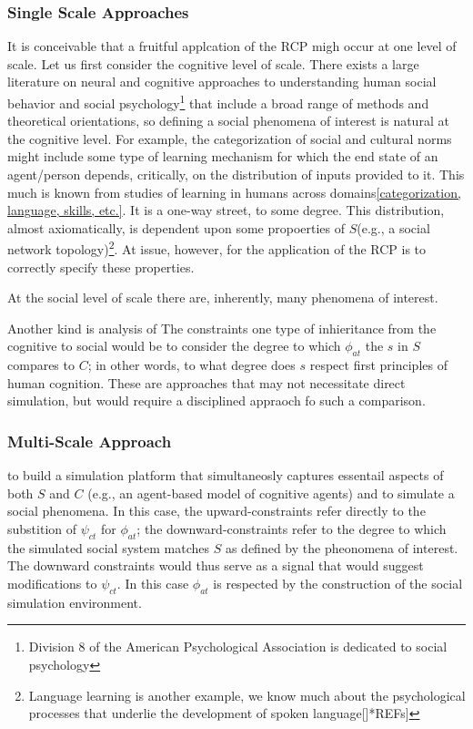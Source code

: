 \documentclass{article}
\begin{document}
\subsubsection{Single Scale Approaches}
It is conceivable that a fruitful applcation of the RCP migh occur at one level of scale.   
Let us first consider the cognitive level of scale.  There exists a large literature on neural and cognitive approaches to understanding human social behavior and social psychology\footnote{Division 8 of the American Psychological Association is dedicated to social psychology } that include a broad range of methods and theoretical orientations, so defining a social phenomena of interest is natural at the cognitive level.  For example, the categorization of social and cultural norms might include some type of learning mechanism for which the end state of an agent/person depends, critically, on the distribution of inputs provided to it.  This much is known from studies of learning in humans across domains\ref{categorization, language, skills, etc.}.  It is a one-way street, to some degree.  This distribution, almost axiomatically, is dependent upon some propoerties of $S$(e.g., a social network topology)\footnote{Language learning is another example, we know much about the psychological processes that underlie the development of spoken language[]*REFs]}.  At issue, however, for the application of the RCP is to correctly specify these properties. 

At the social level of scale there are, inherently, many phenomena of interest.    

Another kind is analysis of The constraints one type of inhieritance from the cognitive to social would be to consider the degree to which $\phi_{at}$ the $s$ in $S$ compares to $C$; in other words, to what degree does $s$ respect first principles of human cognition.  These are approaches that may not necessitate direct simulation, but would require a disciplined appraoch fo such a comparison.

\subsubsection{Multi-Scale Approach}
 
to build a simulation platform that simultaneosly captures essentail aspects of both $S$ and $C$ (e.g., an agent-based model of cognitive agents) and to simulate a social phenomena.  In this case, the upward-constraints refer directly to the substition of  $\psi_{ct}$ for $\phi_{at}$; the downward-constraints refer to the degree to which the simulated social system matches $S$ as defined by the pheonomena of interest.  The downward constraints would thus serve as a signal that would suggest modifications to $\psi_{ct}$.  In this case $\phi_{at}$ is respected by the construction of the social simulation environment.
 
\end{document}
